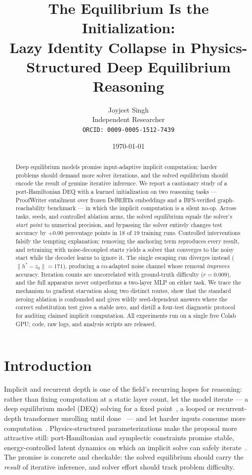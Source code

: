\documentclass[11pt]{article}
\title{The Equilibrium Is the Initialization:\\
Lazy Identity Collapse in Physics-Structured Deep Equilibrium Reasoning}
\author{Joyjeet Singh\\
Independent Researcher\\
\texttt{ORCID: 0009-0005-1512-7439}}
\date{\today}
\begin{document}
\maketitle

\begin{abstract}
Deep equilibrium models promise input-adaptive implicit computation:
harder problems should demand more solver iterations, and the solved
equilibrium should encode the result of genuine iterative inference.
We report a cautionary study of a port-Hamiltonian DEQ with a learned
initialization on two reasoning tasks --- ProofWriter entailment over
frozen DeBERTa embeddings and a BFS-verified graph-reachability
benchmark --- in which the implicit computation is a silent no-op.
Across tasks, seeds, and controlled ablation arms, the solved
equilibrium equals the solver's \emph{start point} to numerical
precision, and bypassing the solver entirely changes test accuracy by
$+0.00$ percentage points in 18 of 19 training runs. Controlled
interventions falsify the tempting explanation: removing the anchoring
term reproduces every result, and retraining with noise-decoupled
starts yields a solver that converges to the noisy start while the
decoder learns to ignore it. The single escaping run diverges instead
($\lVert h^{*}{-}z_0\rVert = 171$), producing a co-adapted noise
channel whose removal \emph{improves} accuracy. Iteration counts are
uncorrelated with ground-truth difficulty ($r=0.009$), and the full
apparatus never outperforms a two-layer MLP on either task. We trace
the mechanism to gradient starvation along two distinct routes, show
that the standard zeroing ablation is confounded and gives wildly
seed-dependent answers where the correct substitution test gives a
stable zero, and distill a four-test diagnostic protocol for auditing
claimed implicit computation. All experiments run on a single free
Colab GPU; code, raw logs, and analysis scripts are released.
\end{abstract}


\section{Introduction}\label{sec:intro}
Implicit and recurrent depth is one of the field's recurring hopes for
reasoning: rather than fixing computation at a static layer count, let
the model iterate --- a deep equilibrium model (DEQ) solving for a
fixed point~\citep{bai2019deep}, a looped or recurrent-depth
transformer unrolling until done~\citep{dehghani2019universal,
geiping2025scaling} --- and let harder inputs consume more
computation~\citep{graves2016adaptive}.
Physics-structured parameterizations make the proposal more
attractive still: port-Hamiltonian and symplectic constraints promise
stable, energy-controlled latent dynamics on which an implicit solve
can safely iterate~\citep{greydanus2019hamiltonian, jin2020sympnets,
desai2021port}.
The promise is concrete and checkable: the solved equilibrium should
carry the \emph{result} of iterative inference, and solver effort
should track problem difficulty.
\end{document}
